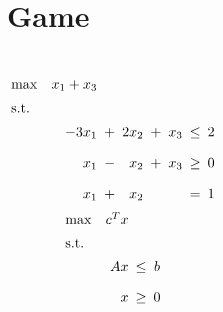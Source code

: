 \section{Game}

\begin{frame}
  \begin{columns}
	  \begin{equation*}
		\setlength\arraycolsep{2.5pt}
		\begin{array}{l@{\quad}rcrcrcr}
		  \max 	& x_1 + x_3 	&	&	&	&	&	&	\\[5pt]
		  \text{s.t.} 	&	&	&	&	&	&	&	\\[5pt]
		  &	-3x_1 &+&	2x_2	&+&	x_3	&\leq& 2 \\[10pt]
		  &	x_1	  &-&	x_2 	&+& x_3 &\geq& 0 \\[10pt]
		  & x_1   &+&	x_2		& &		&=&	1
		\end{array}
	  \end{equation*}
	  \begin{equation*}
		\setlength\arraycolsep{2.5pt}
		\begin{array}{l@{\quad}rcc}
		  \max 	& c^{T}x	&	&	\\[5pt]
		  \text{s.t.} 	&	&	&	\\[5pt]
				&	Ax 	&	\leq	&	b	\\[10pt]
				&	x	& 	\geq 	&	0	
		\end{array}
	  \end{equation*}
  \end{columns}
\end{frame}
